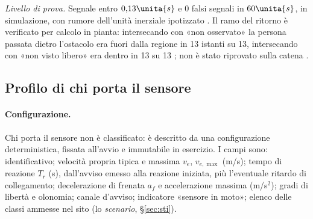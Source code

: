 \emph{Livello di prova.} Segnale entro $0{,}13\unita{s}$ e 0 falsi segnali in $60\unita{s}$, in simulazione, con rumore dell'unità inerziale ipotizzato . Il ramo del ritorno è verificato per calcolo in pianta: intersecando con «non osservato» la persona passata dietro l'ostacolo era fuori dalla regione in 13 istanti su 13, intersecando con «non visto libero» era dentro in 13 su 13 ; non è stato riprovato sulla catena .

\subsection{Profilo di chi porta il sensore}\label{sec:lim-portatore}

\paragraph{Configurazione.} Chi porta il sensore non è classificato: è descritto da una configurazione deterministica, fissata all'avvio e immutabile in esercizio. I campi sono: identificativo; velocità propria tipica e massima $v_e$, $v_{e,\max}$ (m/s); tempo di reazione $T_r$ (s), dall'avviso emesso alla reazione iniziata, più l'eventuale ritardo di collegamento; decelerazione di frenata $a_f$ e accelerazione massima (m/s$^2$); gradi di libertà e olonomia; canale d'avviso; indicatore «sensore in moto»; elenco delle classi ammesse nel sito (lo \emph{scenario}, \S\ref{sec:sti}).


